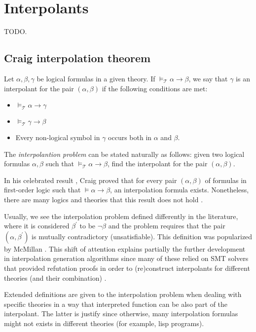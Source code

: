 \section{Interpolants}

TODO.

\subsection{Craig interpolation theorem}

Let $\alpha, \beta, \gamma$ be logical formulas in a given theory. If
$\models_{\mathcal{T}} \alpha \rightarrow \beta$, we say that $\gamma$ is an
interpolant for the pair $(\alpha, \beta)$ if the following conditions
are met:

\begin{itemize}
\item $\models_{\mathcal{T}} \alpha \rightarrow \gamma$
\item $\models_{\mathcal{T}} \gamma \rightarrow \beta$
\item Every non-logical symbol in $\gamma$ occurs both in $\alpha$ and
  $\beta$.
\end{itemize}

The \emph{interpolantion problem} can be stated naturally as follows: given two
logical formulas $\alpha, \beta$ such that $\models_{\mathcal{T}} \alpha \rightarrow \beta$, find
the interpolant for the pair $(\alpha, \beta)$.

In his celebrated result \cite{10.2307/2963594}, Craig proved that for every pair
$(\alpha, \beta)$ of formulas in first-order logic such that
$\models \alpha \rightarrow \beta$, an interpolation formula exists. Nonetheless,
there are many logics and theories that this result does not hold \cite{komori1978}.

Usually, we see the interpolation problem defined differently in the literature, 
where it is considered $\beta^{'}$ to be $\neg \beta$ and 
the problem requires that the pair $(\alpha, \beta^{'})$
is mutually contradictory (unsatisfiable). This definition was popularized by 
McMillan \cite{10.1007/978-3-540-24730-2_2}. This shift of attention explains 
partially the further development in interpolation generation algorithms 
since many of these relied on SMT solvers that provided refutation proofs 
in order to (re)construct interpolants for different theories (and their 
combination) \cite{10.1007/978-3-642-02959-2_17, 
10.1007/978-3-642-36742-7_9, mcmillan2011interpolants}.

Extended definitions are given to the interpolation problem when dealing with specific
theories \cite{10.1007/11532231_26} in a way that interpreted function can be also part of
the interpolant. The latter is justify since otherwise, many interpolation formulas might
not exists in different theories (for example, lisp programs).

